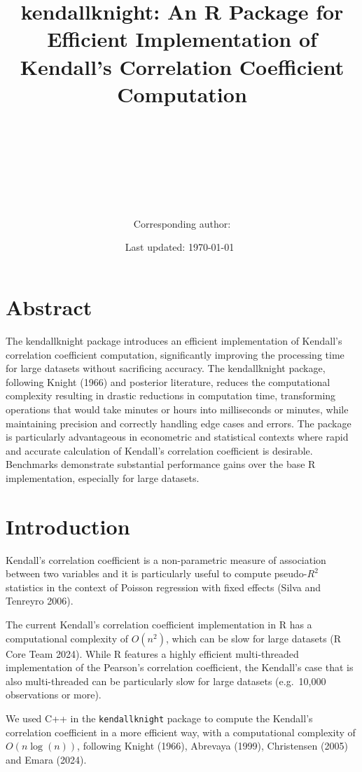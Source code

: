 \documentclass[12pt]{article}
\author{
  \\\\\\
  \smallskip\\
  \\\\
  \smallskip\\
  Corresponding author: 
}
\title{kendallknight: An R Package for Efficient Implementation of
Kendall's Correlation Coefficient Computation}
\date{Last updated: \today\ \currenttime}
\begin{document}
\maketitle


\thispagestyle{empty}
\tableofcontents
\setcounter{page}{0}
\clearpage

\afterpage{\setlength\parskip{10pt}}

\section{Abstract}\label{abstract}

The kendallknight package introduces an efficient implementation of
Kendall's correlation coefficient computation, significantly improving
the processing time for large datasets without sacrificing accuracy. The
kendallknight package, following Knight (1966) and posterior literature,
reduces the computational complexity resulting in drastic reductions in
computation time, transforming operations that would take minutes or
hours into milliseconds or minutes, while maintaining precision and
correctly handling edge cases and errors. The package is particularly
advantageous in econometric and statistical contexts where rapid and
accurate calculation of Kendall's correlation coefficient is desirable.
Benchmarks demonstrate substantial performance gains over the base R
implementation, especially for large datasets.

\section{Introduction}\label{introduction}

Kendall's correlation coefficient is a non-parametric measure of
association between two variables and it is particularly useful to
compute pseudo-\(R^2\) statistics in the context of Poisson regression
with fixed effects (Silva and Tenreyro 2006).

The current Kendall's correlation coefficient implementation in R has a
computational complexity of \(O(n^2)\), which can be slow for large
datasets (R Core Team 2024). While R features a highly efficient
multi-threaded implementation of the Pearson's correlation coefficient,
the Kendall's case that is also multi-threaded can be particularly slow
for large datasets (e.g.~10,000 observations or more).

We used C++ in the \texttt{kendallknight} package to compute the
Kendall's correlation coefficient in a more efficient way, with a
computational complexity of \(O(n \log(n))\), following Knight (1966),
Abrevaya (1999), Christensen (2005) and Emara (2024).
\end{document}
